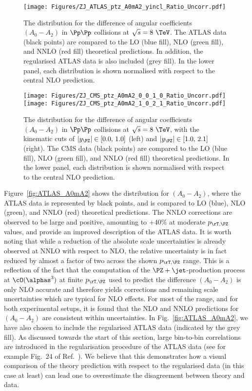 \begin{figure}
\centering
\texttt{[image: Figures/ZJ\_ATLAS\_ptz\_A0mA2\_yincl\_Ratio\_Uncorr.pdf]}
\caption{\small 
The \ptz distribution for the difference of angular coefficients $(A_0-A_2)$ in $\Pp\Pp$ collisions at $\sqrt{s} = 8~\TeV$. 
The ATLAS data (black points) are compared to the LO (blue fill), NLO (green fill), and NNLO (red fill) 
theoretical predictions. In addition, the regularised ATLAS data is also included (grey fill). In the lower panel, 
each distribution is shown normalised with respect to the central NLO prediction.
}
\label{fig:ATLAS_A0mA2}
\bigskip
\texttt{[image: Figures/ZJ\_CMS\_ptz\_A0mA2\_0\_0\_1\_0\_Ratio\_Uncorr.pdf]} \hfill
\texttt{[image: Figures/ZJ\_CMS\_ptz\_A0mA2\_1\_0\_2\_1\_Ratio\_Uncorr.pdf]}
\caption{\small
The \ptz distribution for the difference of angular coefficients $(A_0-A_2)$ in $\Pp\Pp$ collisions at $\sqrt{s} = 8~\TeV$,
with the kinematic cuts of $\lvert\yz\rvert \in [0.0,\,1.0]$ (left) and $\lvert\yz\rvert \in [1.0,\,2.1]$ (right). 
The CMS data (black points) are compared to the LO (blue fill), NLO (green fill), and NNLO (red fill) 
theoretical predictions. In the lower panel, each distribution is shown normalised with respect to the central NLO prediction.}
\label{fig:CMS_A0mA2}
\end{figure}

Figure~\ref{fig:ATLAS_A0mA2} shows the \ptz distribution for $(A_0-A_2)$,
where the ATLAS data is represented by black points, and is compared to LO (blue), 
NLO (green), and NNLO (red) theoretical predictions.
%
The NNLO corrections are observed to be large and positive, amounting to $+40\%$ at moderate $\ptz$ values,
and provide an improved description of the ATLAS data. It is worth noting that while a reduction of the absolute 
scale uncertainties is already observed at NNLO with respect to NLO, the relative uncertainty is in fact reduced 
by almost a factor of two across the shown $\ptz$ range.
%
This is a reflection of the fact that the computation of the $\PZ+\jet$-production process at
$\cO(\alphas^3)$ at finite $\ptz$ used to predict the difference $(A_0-A_2)$ is only NLO accurate  
and therefore yields corrections and remaining scale uncertainties which are typical for NLO
effects.
%
For most of the \ptz range, and for both experimental setups, it is found that the NLO and NNLO predictions 
for $(A_0-A_2)$ are consistent within uncertainties.
%
In Fig.~\ref{fig:ATLAS_A0mA2}, we have also chosen to include the regularised ATLAS data (indicated
by the grey fill). As discussed towards the start of this section, large bin-to-bin correlations are introduced
in the regularisation procedure of the ATLAS data (see for example Fig.~24 of Ref.~\cite{Aad:2016izn}).
We believe that this demonstrates how a visual comparison of the theory prediction with respect to the
regularised data (in this case at least) can lead one to overestimate the disagreement between theory and data.
%


